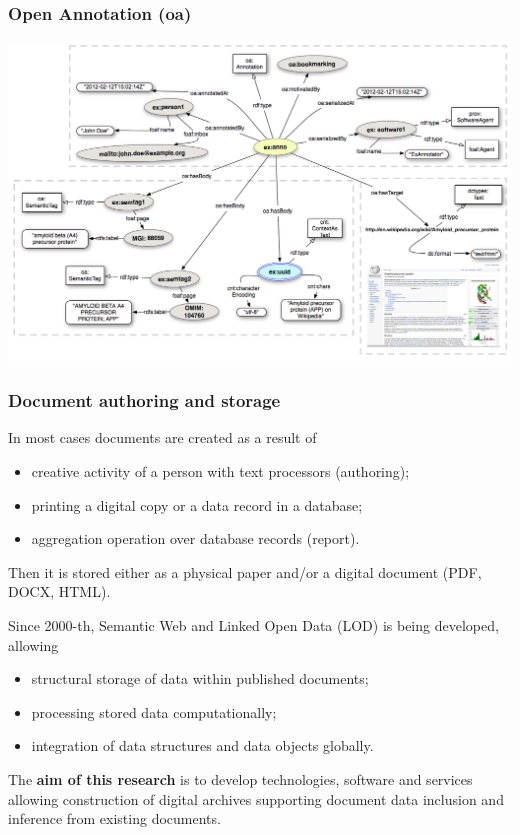 \documentclass[10pt]{beamer}
\begin{document}
\begin{frame}
  \frametitle{Open Annotation (oa)}
\begin{adjustwidth}{-3em}{-3em}
  \centering
  \includegraphics[width=1\linewidth]{Open-Annotation_CB_Bookmarking_and_Semantically_Tagging_A_webpage_spec20130128.png}
\end{adjustwidth}

\end{frame}

\begin{frame}
  \frametitle{Document authoring and storage}
  In most cases documents are created as a result of
  \begin{itemize}
  \item creative activity of a person with text processors (authoring);
  \item printing a digital copy or a data record in a database;
  \item aggregation operation over database records (report).
  \end{itemize}
  Then it is stored either as a physical paper and/or a digital document (PDF, DOCX, HTML).

  Since 2000-th, Semantic Web and Linked Open Data (LOD) is being developed, allowing
  \begin{itemize}
  \item structural storage of data within published documents;
  \item processing stored data computationally;
  \item integration of data structures and data objects globally.
  \end{itemize}

  The \textbf{aim of this research} is to develop technologies, software and services allowing construction of digital archives supporting document data inclusion and inference from existing documents.
\end{frame}
\end{document}
